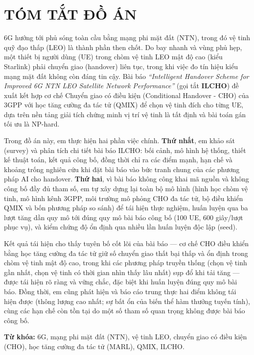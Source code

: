 \section*{TÓM TẮT ĐỒ ÁN}
6G hướng tới phủ sóng toàn cầu bằng mạng phi mặt đất (NTN), trong đó vệ tinh quỹ đạo thấp (LEO) là thành phần then chốt. Do bay nhanh và vùng phủ hẹp, một thiết bị người dùng (UE) trong chòm vệ tinh LEO mật độ cao (kiểu Starlink) phải chuyển giao (handover) liên tục, trong khi việc đo tín hiệu kiểu mạng mặt đất không còn đáng tin cậy. Bài báo \textit{``Intelligent Handover Scheme for Improved 6G NTN LEO Satellite Network Performance''} (gọi tắt \textbf{ILCHO}) đề xuất kết hợp cơ chế Chuyển giao có điều kiện (Conditional Handover - CHO) của 3GPP với học tăng cường đa tác tử (QMIX) để chọn vệ tinh đích cho từng UE, dựa trên nền tảng giải tích chứng minh vị trí vệ tinh là tất định và bài toán gán tối ưu là NP-hard.

Trong đồ án này, em thực hiện hai phần việc chính. \textbf{Thứ nhất}, em khảo sát (survey) và phân tích chi tiết bài báo ILCHO: bối cảnh, mô hình hệ thống, thiết kế thuật toán, kết quả công bố, đồng thời chỉ ra các điểm mạnh, hạn chế và khoảng trống nghiên cứu khi đặt bài báo vào bức tranh chung của các phương pháp AI cho handover. \textbf{Thứ hai}, vì bài báo không công khai mã nguồn và không công bố đầy đủ tham số, em tự xây dựng lại toàn bộ mô hình (hình học chòm vệ tinh, mô hình kênh 3GPP, môi trường mô phỏng CHO đa tác tử, bộ điều khiển QMIX và bốn phương pháp so sánh) để tái hiện thực nghiệm, huấn luyện qua ba lượt tăng dần quy mô tới đúng quy mô bài báo công bố (100 UE, 600 giây/lượt phục vụ), và kiểm chứng độ ổn định qua nhiều lần huấn luyện độc lập (seed).

Kết quả tái hiện cho thấy tuyên bố cốt lõi của bài báo — cơ chế CHO điều khiển bằng học tăng cường đa tác tử giữ số chuyển giao thất bại thấp và ổn định trong chòm vệ tinh mật độ cao, trong khi các phương pháp truyền thống (chọn vệ tinh gần nhất, chọn vệ tinh có thời gian nhìn thấy lâu nhất) sụp đổ khi tải tăng — được tái hiện rõ ràng và vững chắc, đặc biệt khi huấn luyện đúng quy mô bài báo. Đồng thời, em cũng phát hiện và báo cáo trung thực hai điểm không tái hiện được (thông lượng cao nhất; sự bất ổn của biến thể hàm thưởng tuyến tính), cùng các hạn chế còn tồn tại do một số tham số quan trọng không được bài báo công bố.

\vspace{6pt}
\noindent\textbf{Từ khóa:} 6G, mạng phi mặt đất (NTN), vệ tinh LEO, chuyển giao có điều kiện (CHO), học tăng cường đa tác tử (MARL), QMIX, ILCHO.
